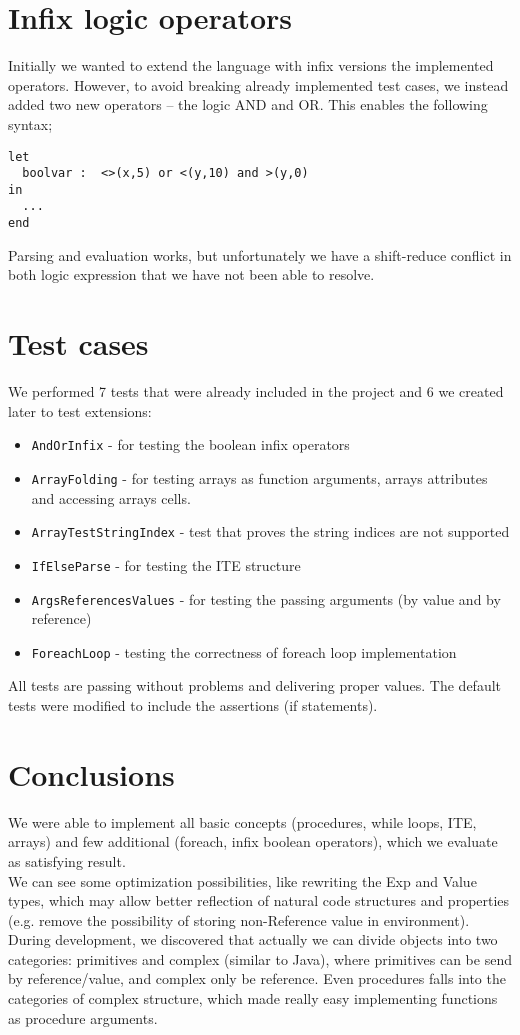 \documentclass[10pt]{scrartcl}
\begin{document}
\section{Infix logic operators}
Initially we wanted to extend the language with infix versions the implemented operators. However, to avoid breaking already implemented test cases, we instead added two new operators -- the logic AND and OR. This enables the following syntax;
\begin{lstlisting}
let
  boolvar :  <>(x,5) or <(y,10) and >(y,0)
in
  ...
end
\end{lstlisting}
Parsing and evaluation works, but unfortunately we have a shift-reduce conflict in both logic expression that we have not been able to resolve.
\section{Test cases}
We performed 7 tests that were already included in the project and 6 we created later to test extensions:
\begin{itemize}
\item \texttt{AndOrInfix} - for testing the boolean infix operators
\item \texttt{ArrayFolding} - for testing arrays as function arguments, arrays attributes and accessing arrays cells.
\item \texttt{ArrayTestStringIndex} - test that proves the string indices are not supported
\item \texttt{IfElseParse} - for testing the ITE structure
\item \texttt{ArgsReferencesValues} - for testing the passing arguments (by value and by reference)
\item \texttt{ForeachLoop} - testing the correctness of foreach loop implementation
\end{itemize}
All tests are passing without problems and delivering proper values. 
The default tests were modified to include the assertions (if statements).

\section{Conclusions}
We were able to implement all basic concepts (procedures, while loops, ITE, arrays) and few additional (foreach, infix boolean operators), which we evaluate as satisfying result. \\
We can see some optimization possibilities, like rewriting the Exp and Value types, which may allow better reflection of natural code structures and properties (e.g. remove the possibility of storing non-Reference value in environment). \\
During development, we discovered that actually we can divide objects into two categories: primitives and complex (similar to Java), where primitives can be send by reference/value, and complex only be reference. Even procedures falls into the categories of complex structure, which made really easy implementing functions as procedure arguments. 
\end{document}
